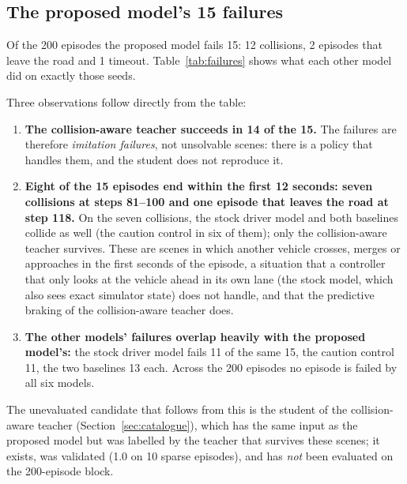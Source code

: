 \subsection{The proposed model's 15 failures}
Of the 200 episodes the proposed model fails 15: 12 collisions, 2 episodes that leave the road and 1 timeout. Table~\ref{tab:failures} shows what each other model did on exactly those seeds.
\begin{table}[H]\centering\small
\caption{The 15 episodes (of 200, clear weather, sparse traffic) that the proposed model fails, and the outcome of the other five models on the same seeds. The number in brackets is the step (10 per second) at which the proposed model's episode ended.}\label{tab:failures}
\resizebox{\textwidth}{!}{}
\end{table}
Three observations follow directly from the table:
\begin{enumerate}
\item \textbf{The collision-aware teacher succeeds in 14 of the 15.} The failures are therefore \emph{imitation failures}, not unsolvable scenes: there is a policy that handles them, and the student does not reproduce it.
\item \textbf{Eight of the 15 episodes end within the first 12 seconds: seven collisions at steps 81--100 and one episode that leaves the road at step 118.} On the seven collisions, the stock driver model and both baselines collide as well (the caution control in six of them); only the collision-aware teacher survives. These are scenes in which another vehicle crosses, merges or approaches in the first seconds of the episode, a situation that a controller that only looks at the vehicle ahead in its own lane
  (the stock model, which also sees exact simulator state) does not handle, and that the predictive braking of the collision-aware teacher does.
\item \textbf{The other models' failures overlap heavily with the proposed model's:} the stock driver model fails 11 of the same 15, the caution control 11, the two baselines 13 each. Across the 200 episodes no episode is failed by all six models.
\end{enumerate}
The unevaluated candidate that follows from this is the student of the collision-aware teacher (Section~\ref{sec:catalogue}), which has the same input as the proposed model but was labelled by the teacher that survives these scenes; it exists, was validated (1.0 on 10 sparse episodes), and has \emph{not} been evaluated on the 200-episode block.

